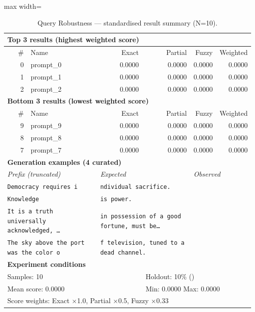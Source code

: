 \begin{table}[htbp]
\centering
\caption{Query Robustness — standardised result summary (N=10).}
\label{tab:query_robustness_summary}
\begin{adjustbox}{max width=\textwidth}
\begin{tabular}{r p{5cm} r r r r}
\toprule
\multicolumn{6}{l}{\textbf{Top 3 results (highest weighted score)}} \\
\midrule
\# & Name & Exact & Partial & Fuzzy & Weighted \\
\midrule
0 & prompt\_0 & 0.0000 & 0.0000 & 0.0000 & 0.0000 \\
1 & prompt\_1 & 0.0000 & 0.0000 & 0.0000 & 0.0000 \\
2 & prompt\_2 & 0.0000 & 0.0000 & 0.0000 & 0.0000 \\
\midrule
\multicolumn{6}{l}{\textbf{Bottom 3 results (lowest weighted score)}} \\
\midrule
\# & Name & Exact & Partial & Fuzzy & Weighted \\
\midrule
9 & prompt\_9 & 0.0000 & 0.0000 & 0.0000 & 0.0000 \\
8 & prompt\_8 & 0.0000 & 0.0000 & 0.0000 & 0.0000 \\
7 & prompt\_7 & 0.0000 & 0.0000 & 0.0000 & 0.0000 \\
\midrule
\multicolumn{6}{l}{\textbf{Generation examples (4 curated)}} \\
\midrule
\multicolumn{2}{l}{\textit{Prefix (truncated)}} & \multicolumn{2}{l}{\textit{Expected}} & \multicolumn{2}{l}{\textit{Observed}} \\
\midrule
\multicolumn{2}{l}{\texttt{Democracy requires i}} & \multicolumn{2}{l}{\texttt{ndividual sacrifice.}} & \multicolumn{2}{l}{\texttt{}} \\
\multicolumn{2}{l}{\texttt{Knowledge}} & \multicolumn{2}{l}{\texttt{is power.}} & \multicolumn{2}{l}{\texttt{}} \\
\multicolumn{2}{l}{\texttt{It is a truth universally acknowledged, \ldots}} & \multicolumn{2}{l}{\texttt{in possession of a good fortune, must be\ldots}} & \multicolumn{2}{l}{\texttt{}} \\
\multicolumn{2}{l}{\texttt{The sky above the port was the color o}} & \multicolumn{2}{l}{\texttt{f television, tuned to a dead channel.}} & \multicolumn{2}{l}{\texttt{}} \\
\midrule
\multicolumn{6}{l}{\textbf{Experiment conditions}} \\
\midrule
\multicolumn{3}{l}{Samples: 10} & \multicolumn{3}{l}{Holdout: 10\% ()} \\
\multicolumn{3}{l}{Mean score: 0.0000} & \multicolumn{3}{l}{Min: 0.0000 \quad Max: 0.0000} \\
\multicolumn{6}{l}{Score weights: Exact $\times$1.0, Partial $\times$0.5, Fuzzy $\times$0.33} \\
\bottomrule
\end{tabular}
\end{adjustbox}
\end{table}
